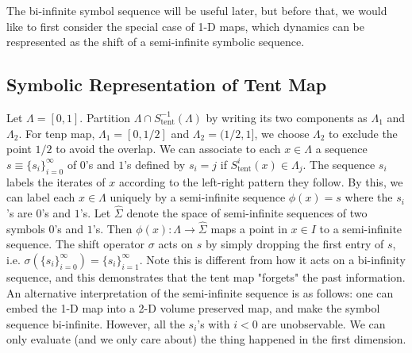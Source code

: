 \documentclass{article}
\begin{document}
 

The bi-infinite symbol sequence will be useful later, but before that, we would like to first consider the special case of 1-D maps, which dynamics can be respresented as the shift of a semi-infinite symbolic sequence.  

\subsection{Symbolic Representation of Tent Map}

 Let $\Lambda=[0, 1]$. Partition $\Lambda \cap S^{-1}_{\text{tent}}(\Lambda)$ by writing its two components as $\Lambda_1$ and $\Lambda_2$. For tenp map, $\Lambda_1=[0, 1/2]$ and $\Lambda_2=(1/2 ,1]$, we choose $\Lambda_2$ to exclude the point $1/2$ to avoid the overlap. We can associate to each $x \in \Lambda $ a sequence $s \equiv \{s_i \}_{i=0}^{\infty}$ of $0$'s and $1$'s defined by $s_i=j$ if $S_{\text{tent}}^i(x) \in \Lambda_j$. The sequence ${s_i}$ labels the iterates of $x$ according to the left-right pattern they follow. By this, we can label each $x \in \Lambda$ uniquely by a semi-infinite sequence $\phi(x)=s$ where the $s_i$'s are $0$'s and $1$'s. Let $\hat{\Sigma}$ denote the space of semi-infinite sequences of two symbols $0$'s and $1$'s. Then $\phi(x): \Lambda \rightarrow \hat{\Sigma}$ maps a point in $x\in I$ to a semi-infinite sequence. The shift operator $\sigma$ acts on $s$ by simply dropping the first entry of $s$, i.e. $\sigma(\{s_i\}_{i=0}^{\infty})=\{s_i\}_{i=1}^{\infty}$. Note this is different from how it acts on a bi-infinity sequence, and this demonstrates that the tent map "forgets" the past information. An alternative interpretation of the semi-infinite sequence is as follows: one can embed the 1-D map into a 2-D volume preserved map, and make the symbol sequence bi-infinite. However, all the $s_i$'s with $i<0$ are unobservable. We can only evaluate (and we only care about) the thing happened in the first dimension. 
\end{document}
